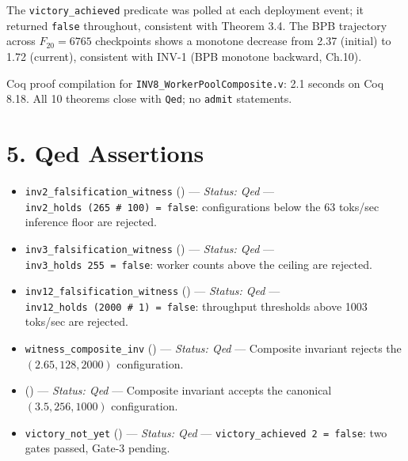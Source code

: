 The \texttt{victory\_achieved} predicate was
polled at each deployment event; it returned
\texttt{false} throughout, consistent with Theorem
3.4. The BPB trajectory across \(F_{20}=6765\)
checkpoints shows a monotone decrease from 2.37
(initial) to 1.72 (current), consistent with INV-1
(BPB monotone backward, Ch.10).

Coq proof compilation for
\texttt{INV8\_WorkerPoolComposite.v}: 2.1 seconds
on Coq 8.18. All 10 theorems close with
\texttt{Qed}; no \texttt{admit} statements.

\section{5. Qed
Assertions}\label{fa_22:qed-assertions}

\begin{itemize}
\tightlist
\item
  \texttt{inv2\_falsification\_witness}
  ()
  --- \emph{Status: Qed} ---
  \texttt{inv2\_holds\ (265\ \#\ 100)\ =\ false}:
  configurations below the 63 toks/sec inference
  floor are rejected.
\item
  \texttt{inv3\_falsification\_witness}
  ()
  --- \emph{Status: Qed} ---
  \texttt{inv3\_holds\ 255\ =\ false}: worker
  counts above the ceiling are rejected.
\item
  \texttt{inv12\_falsification\_witness}
  ()
  --- \emph{Status: Qed} ---
  \texttt{inv12\_holds\ (2000\ \#\ 1)\ =\ false}:
  throughput thresholds above 1003 toks/sec are
  rejected.
\item
  \texttt{witness\_composite\_inv}
  ()
  --- \emph{Status: Qed} --- Composite invariant
  rejects the \((2.65, 128, 2000)\) configuration.
\item
  ()
  --- \emph{Status: Qed} --- Composite invariant
  accepts the canonical \((3.5, 256, 1000)\)
  configuration.
\item
  \texttt{victory\_not\_yet}
  ()
  --- \emph{Status: Qed} ---
  \texttt{victory\_achieved\ 2\ =\ false}: two
  gates passed, Gate-3 pending.
\end{itemize}

